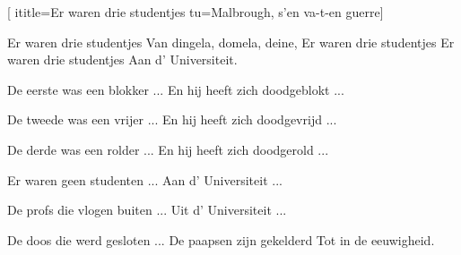  [
ititle={Er waren drie studentjes}
tu={Malbrough, s'en va-t-en guerre}]

\beginverse
Er waren drie studentjes
Van dingela, domela, deine,
Er waren drie studentjes
Er waren drie studentjes
Aan d' Universiteit.
\endverse

\beginverse
De eerste was een blokker ...
En hij heeft zich doodgeblokt ...
\endverse

\beginverse
De tweede was een vrijer ...
En hij heeft zich doodgevrijd ...
\endverse

\beginverse
De derde was een rolder ...
En hij heeft zich doodgerold ...
\endverse

\beginverse
Er waren geen studenten ...
Aan d' Universiteit ...
\endverse

\beginverse
De profs die vlogen buiten ...
Uit d' Universiteit ...
\endverse

\beginverse
De doos die werd gesloten ...
De paapsen zijn gekelderd
Tot in de eeuwigheid.
\endverse
\endsong